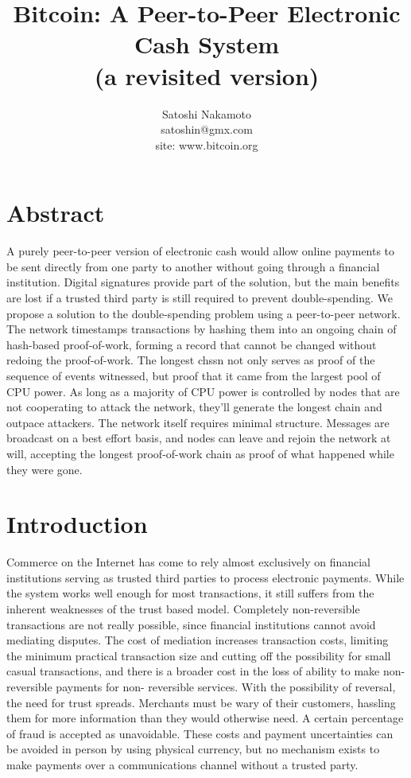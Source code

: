 \documentclass[10pt]{book}
\author{Satoshi Nakamoto  \\ satoshin@gmx.com  \\ site: www.bitcoin.org}
\title{Bitcoin: A Peer-to-Peer Electronic Cash System \\ \small{(a revisited version)}}
\begin{document}
\maketitle
\tableofcontents
\newenvironment{rcases} {\left\lbrace\begin{aligned}} {\end{aligned}\right\rbrace}

\part*{Abstract}
A purely peer-to-peer version of electronic cash would allow online payments to be sent directly from one party to another without going through a financial institution.
Digital signatures provide part of the solution, but the main benefits are lost if a trusted third party is still required to prevent double-spending.
We propose a solution to the double-spending problem using a peer-to-peer network.
The network timestamps transactions by hashing them into an ongoing chain of hash-based proof-of-work, forming a record that cannot be changed without redoing the proof-of-work.
The longest chssn not only serves as proof of the sequence of events witnessed, but proof that it came from the largest pool of CPU power.
As long as a majority of CPU power is controlled by nodes that are not cooperating to attack the network, they'll generate the longest chain and outpace attackers.
The network itself requires minimal structure.
Messages are broadcast on a best effort basis, and nodes can leave and rejoin the network at will, accepting the longest proof-of-work chain as proof of what happened while they were gone.

\part*{Introduction}
Commerce on the Internet has come to rely almost exclusively on financial institutions serving as trusted third parties to process electronic payments.
While the system works well enough for most transactions, it still suffers from the inherent weaknesses of the trust based model.
Completely non-reversible transactions are not really possible, since financial institutions cannot avoid mediating disputes.
The cost of mediation increases transaction costs, limiting the minimum practical transaction size and cutting off the possibility for small casual transactions, and there is a broader cost in the loss of ability to make non-reversible payments for non- reversible services.
With the possibility of reversal, the need for trust spreads.
Merchants must be wary of their customers, hassling them for more information than they would otherwise need.
A certain percentage of fraud is accepted as unavoidable.
These costs and payment uncertainties can be avoided in person by using physical currency, but no mechanism exists to make payments over a communications channel without a trusted party.
\end{document}
